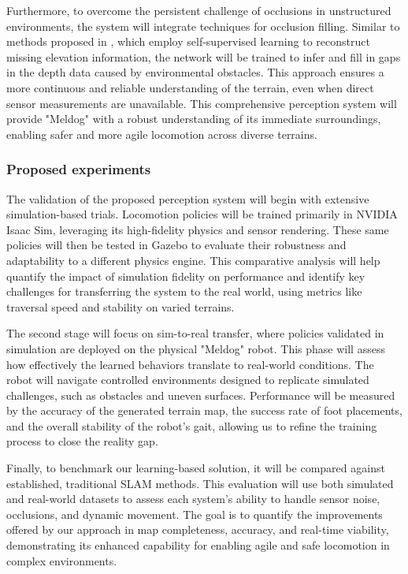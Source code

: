 Furthermore, to overcome the persistent challenge of occlusions in unstructured environments, the system will integrate techniques for occlusion filling. Similar to methods proposed in \cite{Reconstructing_Occluded_Elevation_Information_in_Terrain_Maps_With_Self-Supervised_Learning}, which employ self-supervised learning to reconstruct missing elevation information, the network will be trained to infer and fill in gaps in the depth data caused by environmental obstacles. This approach ensures a more continuous and reliable understanding of the terrain, even when direct sensor measurements are unavailable. This comprehensive perception system will provide "Meldog" with a robust understanding of its immediate surroundings, enabling safer and more agile locomotion across diverse terrains.

\subsubsection{Proposed experiments}

The validation of the proposed perception system will begin with extensive simulation-based trials. Locomotion policies will be trained primarily in NVIDIA Isaac Sim, leveraging its high-fidelity physics and sensor rendering. These same policies will then be tested in Gazebo to evaluate their robustness and adaptability to a different physics engine. This comparative analysis will help quantify the impact of simulation fidelity on performance and identify key challenges for transferring the system to the real world, using metrics like traversal speed and stability on varied terrains.

The second stage will focus on sim-to-real transfer, where policies validated in simulation are deployed on the physical "Meldog" robot. This phase will assess how effectively the learned behaviors translate to real-world conditions. The robot will navigate controlled environments designed to replicate simulated challenges, such as obstacles and uneven surfaces. Performance will be measured by the accuracy of the generated terrain map, the success rate of foot placements, and the overall stability of the robot's gait, allowing us to refine the training process to close the reality gap.

Finally, to benchmark our learning-based solution, it will be compared against established, traditional SLAM methods. This evaluation will use both simulated and real-world datasets to assess each system's ability to handle sensor noise, occlusions, and dynamic movement. The goal is to quantify the improvements offered by our approach in map completeness, accuracy, and real-time viability, demonstrating its enhanced capability for enabling agile and safe locomotion in complex environments.
